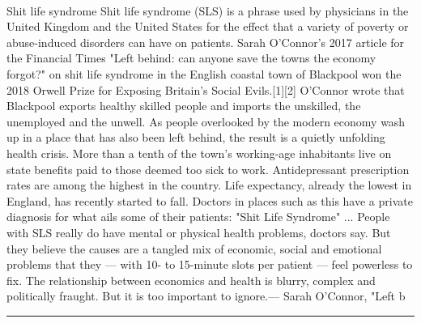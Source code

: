 \documentclass[10pt,a4paper]{article}
\begin{document}
\begin{multicols*}{2}
\paragraph{}
Shit life syndrome
Shit life syndrome (SLS) is a phrase used by physicians in the United Kingdom and the United States for the effect that a variety of poverty or abuse-induced disorders can have on patients.
Sarah O'Connor's 2017 article for the Financial Times "Left behind: can anyone save the towns the economy forgot?" on shit life syndrome in the English coastal town of Blackpool won the 2018 Orwell Prize for Exposing Britain's Social Evils.[1][2] O'Connor wrote that
Blackpool exports healthy skilled people and imports the unskilled, the unemployed and the unwell. As people overlooked by the modern economy wash up in a place that has also been left behind, the result is a quietly unfolding health crisis. More than a tenth of the town's working-age inhabitants live on state benefits paid to those deemed too sick to work. Antidepressant prescription rates are among the highest in the country. Life expectancy, already the lowest in England, has recently started to fall. Doctors in places such as this have a private diagnosis for what ails some of their patients: "Shit Life Syndrome" ... People with SLS really do have mental or physical health problems, doctors say. But they believe the causes are a tangled mix of economic, social and emotional problems that they — with 10- to 15-minute slots per patient — feel powerless to fix. The relationship between economics and health is blurry, complex and politically fraught. But it is too important to ignore.— Sarah O'Connor, "Left b
\par\noindent\textcolor{red}{\rule{\linewidth}{0.2mm}}
\vfill
\null
\noindent\begin{minipage}{\linewidth}

\end{minipage}
\end{multicols*}
\end{document}
